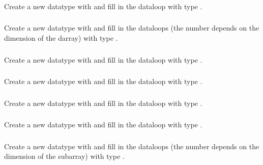 \documentclass{article}
\begin{document}
\subsubsection{}
Create a new datatype with  and fill in the dataloop
with type .

\subsubsection{}
Create a new datatype with  and fill in the
dataloops (the number depends on the dimension of the darray) 
with type .

\subsubsection{}
Create a new datatype with  and fill in the dataloop
with type .

\subsubsection{}
Create a new datatype with  and fill in the dataloop
with type .

\subsubsection{}
Create a new datatype with  and fill in the dataloop
with type .

\subsubsection{}
Create a new datatype with  and fill in the dataloop
with type .

\subsubsection{}
Create a new datatype with  and fill in the
dataloops (the number depends on the dimension of the subarray) 
with type .
\end{document}
